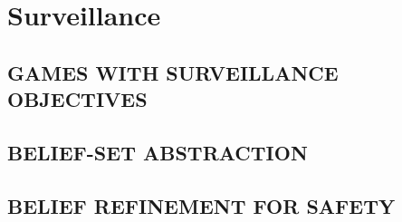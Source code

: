 
\chapter{Surveillance}




% 


\section{GAMES WITH SURVEILLANCE OBJECTIVES}\label{sec:gamedef}

%
%
\section{BELIEF-SET ABSTRACTION}
%
%
%
%
%
%
\section{BELIEF REFINEMENT FOR SAFETY}%
%
%
%
%
%
